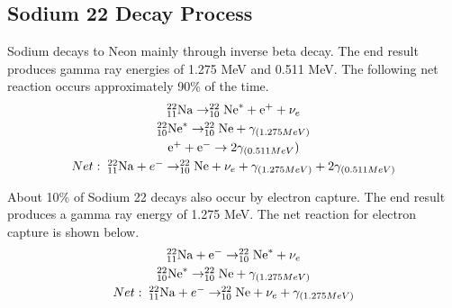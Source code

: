 \documentclass[%
 aip,
rsi,%
 amsmath,amssymb,
 reprint,%
author-numerical,%
]{revtex4-1}
\begin{document}
\subsection{Sodium 22 Decay Process}
Sodium decays to Neon mainly through inverse beta decay. The end result produces gamma ray energies of 1.275 MeV and 0.511 MeV. The following net reaction  occurs approximately 90\% of the time.
\[\begin{array} { c } { _{11}  ^ { 22 }\mathrm { Na }  \rightarrow _{10}^ { 22 }\mathrm { Ne } ^{*}+ \mathrm { e } ^ { + } + \nu _ { e } }\vspace{1mm} \\ { _{10}^ { 22 }\mathrm { Ne } ^{*}\rightarrow _{10}^ { 22 }\mathrm { Ne }+ \gamma _ { ( 1.275 M e V ) } } \vspace{1mm}\\ { \mathrm { e } ^ { + } + \mathrm { e } ^ { - } \rightarrow 2 \gamma _ { ( 0.511 M e V } ) }\vspace{1mm}\\ {Net:\hspace{1mm}_{11}  ^ { 22 }\mathrm { Na }  + e ^ { - } \rightarrow _ { 10 } ^ { 22 }\mathrm { Ne } + \nu _ { e } + \gamma _ { ( 1.275 M e V ) } + 2 \gamma _ { ( 0.511 M e V ) }}\end{array}\]

About 10\% of Sodium 22 decays also occur by electron capture. The end result produces a gamma ray energy of 1.275 MeV. The net reaction for electron capture is shown below.
\[\begin{array} { c} { _{11} ^ { 22 }\mathrm { Na }  + \mathrm { e } ^ { - } \rightarrow _{10} ^ { 22 }\mathrm { Ne } ^ { *} + \nu _ { e } } \vspace{1mm}\\ { _{10} ^ { 22 }\mathrm { Ne } ^ { * } \rightarrow _{10} ^ { 22 }\mathrm { Ne }  + \gamma _ { ( 1.275 M e V ) } }\vspace{1mm}\\ {Net:\hspace{1mm} _ { 11 } ^ { 22 }\mathrm { Na }  + e ^ { - } \rightarrow _ { 10 } ^ { 22 }\mathrm { Ne } + \nu _ { e } + \gamma _ { ( 1.275 M e V ) }} \end{array}\]
\end{document}
